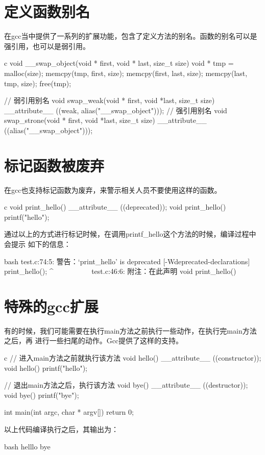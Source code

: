 \section{定义函数别名}
在gcc当中提供了一系列的扩展功能，包含了定义方法的别名。函数的别名可以是强引用，也可以是弱引用。
\begin{code-block}{c}
void __swap_object(void * first, void * last, size_t size)
{
    void * tmp = malloc(size);
    memcpy(tmp, first, size);
    memcpy(first, last, size);
    memcpy(last, tmp, size);
    free(tmp);
}

// 弱引用别名
void swap_weak(void * first, void *last, size_t size)
        __attribute__ ((weak, alias("__swap_object")));
// 强引用别名
void swap_strone(void * first, void *last, size_t size)
        __attribute__ ((alias("__swap_object")));
\end{code-block}

\section{标记函数被废弃}
在gcc也支持标记函数为废弃，来警示相关人员不要使用这样的函数。
\begin{code-block}{c}
void print_hello() __attribute__ ((deprecated));
void print_hello()
{
    printf("hello\n");
}
\end{code-block}

通过以上的方式进行标记时候，在调用printf\_hello这个方法的时候，编译过程中会提示
如下的信息：
\begin{code-block}{bash}
test.c:74:5: 警告：‘print_hello’ is deprecated [-Wdeprecated-declarations]
     print_hello();
     ^~~~~~~~~~~
test.c:46:6: 附注：在此声明
 void print_hello()
\end{code-block}

\section{特殊的gcc扩展}
有的时候，我们可能需要在执行main方法之前执行一些动作，在执行完main方法之后，再
进行一些扫尾的动作。Gcc提供了这样的支持。
\begin{code-block}{c}
// 进入main方法之前就执行该方法
void hello() __attribute__ ((constructor));
void hello()
{
    printf("hello\n");
}

// 退出main方法之后，执行该方法
void bye() __attribute__ ((destructor));
void bye()
{
    printf("bye\n");
}

int main(int argc, char * argv[])
{
    return 0;
}
\end{code-block}

以上代码编译执行之后，其输出为：
\begin{code-block}{bash}
helllo
bye
\end{code-block}
